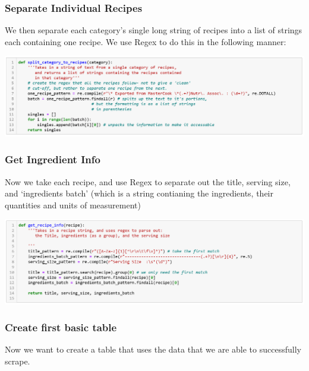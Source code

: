 \documentclass[11pt]{article}
\makeatletter
\def\maxwidth{\ifdim\Gin@nat@width>\linewidth\linewidth
    \else\Gin@nat@width\fi}
\let\Oldincludegraphics\includegraphics
\renewcommand{\includegraphics}[1]{\Oldincludegraphics[width=.8\maxwidth]{#1}}
\makeatother
\begin{document}
    \hypertarget{separate-individual-recipes}{%
\subsubsection{Separate Individual
Recipes}\label{separate-individual-recipes}}

We then separate each category's single long string of recipes into a
list of strings each containing one recipe. We use Regex to do this in
the following manner:

\includegraphics{separate_recipes_code.png}

\hypertarget{get-ingredient-info}{%
\subsubsection{Get Ingredient Info}\label{get-ingredient-info}}

Now we take each recipe, and use Regex to separate out the title,
serving size, and `ingredients batch' (which is a string contianing the
ingredients, their quantities and units of measurement)

\includegraphics{get_recipe_info_code.png}

    \hypertarget{create-first-basic-table}{%
\subsubsection{Create first basic
table}\label{create-first-basic-table}}

Now we want to create a table that uses the data that we are able to
successfully scrape.
\end{document}
